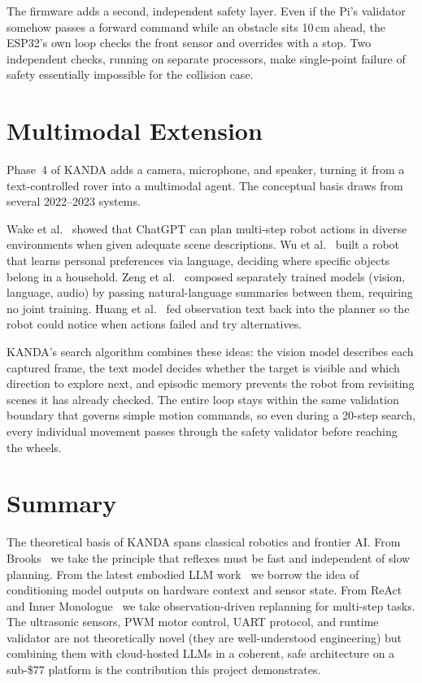 The firmware adds a second, independent safety layer. Even if the Pi's validator somehow passes a forward command while an obstacle sits 10\,cm ahead, the ESP32's own loop checks the front sensor and overrides with a stop. Two independent checks, running on separate processors, make single-point failure of safety essentially impossible for the collision case.

\section{Multimodal Extension}
\label{sec:multimodal}

Phase~4 of KANDA adds a camera, microphone, and speaker, turning it from a text-controlled rover into a multimodal agent. The conceptual basis draws from several 2022--2023 systems.

Wake et al.~\cite{wake2023gptrobot} showed that ChatGPT can plan multi-step robot actions in diverse environments when given adequate scene descriptions. Wu et al.~\cite{wu2023tidybot} built a robot that learns personal preferences via language, deciding where specific objects belong in a household. Zeng et al.~\cite{zeng2023socratic} composed separately trained models (vision, language, audio) by passing natural-language summaries between them, requiring no joint training. Huang et al.~\cite{huang2022innermonologue} fed observation text back into the planner so the robot could notice when actions failed and try alternatives.

KANDA's search algorithm combines these ideas: the vision model describes each captured frame, the text model decides whether the target is visible and which direction to explore next, and episodic memory prevents the robot from revisiting scenes it has already checked. The entire loop stays within the same validation boundary that governs simple motion commands, so even during a 20-step search, every individual movement passes through the safety validator before reaching the wheels.

\section{Summary}
\label{sec:ch2summary}

The theoretical basis of KANDA spans classical robotics and frontier AI. From Brooks~\cite{brooks1986robust} we take the principle that reflexes must be fast and independent of slow planning. From the latest embodied LLM work~\cite{vemprala2024chatgpt,driess2023palme,brohan2023rt2} we borrow the idea of conditioning model outputs on hardware context and sensor state. From ReAct~\cite{yao2023react} and Inner Monologue~\cite{huang2022innermonologue} we take observation-driven replanning for multi-step tasks. The ultrasonic sensors, PWM motor control, UART protocol, and runtime validator are not theoretically novel (they are well-understood engineering) but combining them with cloud-hosted LLMs in a coherent, safe architecture on a sub-\$77 platform is the contribution this project demonstrates.

